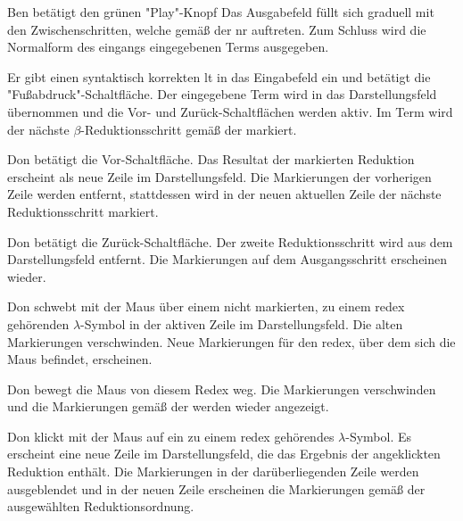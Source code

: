 \documentclass[parskip=full,11pt,twoside]{scrartcl}
\begin{document}
{Ben betätigt den grünen "Play"-Knopf}
{Das Ausgabefeld füllt sich graduell mit den Zwischenschritten, welche gemäß der \gls{nr} auftreten.
Zum Schluss wird die Normalform des eingangs eingegebenen Terms ausgegeben.}


{Er gibt einen syntaktisch korrekten \gls{lt} in das Eingabefeld ein und betätigt
die "Fußabdruck"-Schaltfläche.}
{Der eingegebene Term wird in das Darstellungsfeld übernommen und die Vor- und
Zurück-Schaltflächen werden aktiv. Im Term wird der nächste $\beta$-Reduktionsschritt
gemäß der  markiert.}

{Don betätigt die Vor-Schaltfläche.}
{Das Resultat der markierten Reduktion erscheint als neue Zeile im Darstellungsfeld.
Die Markierungen der vorherigen Zeile werden entfernt, stattdessen wird in der neuen
aktuellen Zeile der nächste Reduktionsschritt markiert.}

{Don betätigt die Zurück-Schaltfläche.}
{Der zweite Reduktionsschritt wird aus dem Darstellungsfeld entfernt. Die Markierungen
auf dem Ausgangsschritt erscheinen wieder.}

{Don schwebt mit der Maus über einem nicht markierten, zu einem \gls{redex} gehörenden
$\lambda$-Symbol in der aktiven Zeile im Darstellungsfeld.}
{Die alten Markierungen verschwinden. Neue Markierungen für den \gls{redex}, über dem
sich die Maus befindet, erscheinen.}

{Don bewegt die Maus von diesem Redex weg.}
{Die Markierungen verschwinden und die Markierungen gemäß der 
werden wieder angezeigt.}

{Don klickt mit der Maus auf ein zu einem \gls{redex} gehörendes $\lambda$-Symbol.}
{Es erscheint eine neue Zeile im Darstellungsfeld, die das Ergebnis der angeklickten
Reduktion enthält. Die Markierungen in der darüberliegenden Zeile werden ausgeblendet
und in der neuen Zeile erscheinen die Markierungen gemäß der ausgewählten
Reduktionsordnung.}
\end{document}
